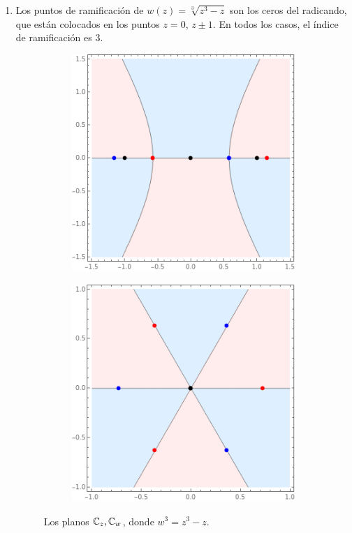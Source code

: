 \begin{solution}
\begin{itemize}
\begin{enumerate}[label=\alph*)]
        \item Los puntos de ramificación de $w(z) = \sqrt [3] {z^3 - z}$ son los ceros del radicando, que están colocados en los puntos $z = 0$, $z \pm 1$. En todos los casos, el índice de ramificación es $3$.
        \begin{figure}[h]
            \centering
            \begin{subfigure}{.4\textwidth}
                \centering
                \includegraphics[scale=0.4]{ramification/3-z.png}
            \end{subfigure}
            \begin{subfigure}{.4\textwidth}
                \centering
                \includegraphics[scale=0.4]{ramification/3-w.png}
            \end{subfigure}
            \caption{Los planos $\mathbb C_z, \mathbb C_w$, donde $w^3 = z^3 - z$.}
        \end{figure}
        

\end{enumerate}
\end{itemize}
\end{solution}
